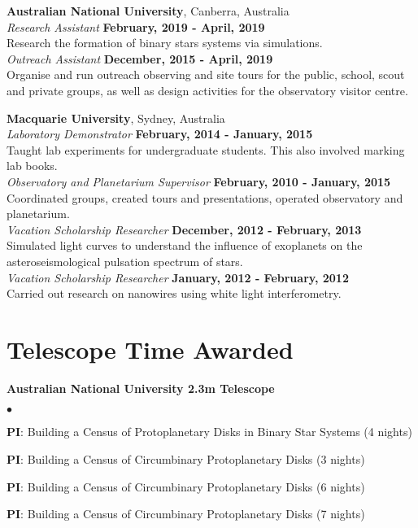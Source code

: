 \documentclass[margin,line]{res}
\newenvironment{list1}{
	\begin{list}{\ding{113}}{%
			\setlength{\itemsep}{0in}
			\setlength{\parsep}{0in} \setlength{\parskip}{0in}
			\setlength{\topsep}{0in} \setlength{\partopsep}{0in} 
			\setlength{\leftmargin}{0.17in}}}{\end{list}}
\newenvironment{list2}{
	\begin{list}{$\bullet$}{%
			\setlength{\itemsep}{0in}
			\setlength{\parsep}{0in} \setlength{\parskip}{0in}
			\setlength{\topsep}{0in} \setlength{\partopsep}{0in} 
			\setlength{\leftmargin}{0.2in}}}{\end{list}}
\begin{document}
\begin{resume}
		{\bf Australian National University}, Canberra, Australia\\
		{\em Research Assistant} \hfill {\bf February, 2019 - April, 2019}\\
		Research the formation of binary stars systems via simulations.\\
		{\em Outreach Assistant} \hfill {\bf December, 2015 - April, 2019}\\
		Organise and run outreach observing and site tours for the public, school, scout and private groups, as well as design activities for the observatory visitor centre.
		
		{\bf Macquarie University}, Sydney, Australia\\
		{\em Laboratory Demonstrator} \hfill {\bf February, 2014 - January, 2015}\\
		Taught lab experiments for undergraduate students. This also involved marking lab books.\\
		{\em Observatory and Planetarium Supervisor} \hfill {\bf February, 2010 - January, 2015}\\
		Coordinated groups, created tours and presentations, operated observatory and planetarium.\\
		{\em Vacation Scholarship Researcher} \hfill {\bf December, 2012 - February, 2013}\\
		Simulated light curves to understand the influence of exoplanets on the asteroseismological pulsation spectrum of stars.\\
		{\em Vacation Scholarship Researcher} \hfill {\bf January, 2012 - February, 2012}\\
		Carried out research on nanowires using white light interferometry.\\
		
		\section{\sc Telescope Time Awarded}
		\begin{list1}
			\item[] {\bf Australian National University 2.3m Telescope}
			\begin{list2}
				\item {\bf PI}: Building a Census of Protoplanetary Disks in Binary Star Systems (4 nights)
				\item {\bf PI}: Building a Census of Circumbinary Protoplanetary Disks (3 nights)
				\item {\bf PI}: Building a Census of Circumbinary Protoplanetary Disks (6 nights)
				\item {\bf PI}: Building a Census of Circumbinary Protoplanetary Disks (7 nights)
			\end{list2}
		\end{list1}
		\vspace{-0.5cm}

\end{resume}
\end{document}
